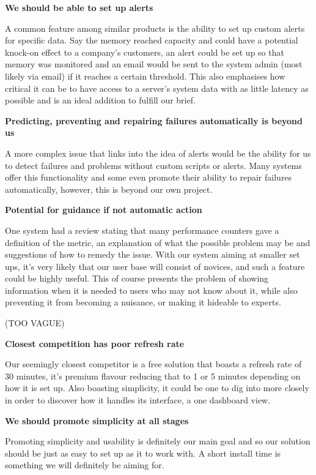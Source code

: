 \documentclass{l3proj}
\begin{document}
\textbf{We should be able to set up alerts}

A common feature among similar products is the ability to set up custom alerts for specific data. Say the memory reached capacity and could have a potential knock-on effect to a company’s customers, an alert could be set up so that memory was monitored and an email would be sent to the system admin (most likely via email) if it reaches a certain threshold. This also emphasises how critical it can be to have access to a server’s system data with as little latency as possible and is an ideal addition to fulfill our brief.

\textbf{Predicting, preventing and repairing failures automatically is beyond us}

A more complex issue that links into the idea of alerts would be the ability for us to detect failures and problems without custom scripts or alerts. Many systems offer this functionality and some even promote their ability to repair failures automatically, however, this is beyond our own project.

\textbf{Potential for guidance if not automatic action}

One system had a review stating that many performance counters gave a definition of the metric, an explanation of what the possible problem may be and suggestions of how to remedy the issue. With our system aiming at smaller set ups, it’s very likely that our user base will consist of novices, and such a feature could be highly useful. This of course presents the problem of showing information when it is needed to users who may not know about it, while also preventing it from becoming a nuisance, or making it hideable to experts.

(TOO VAGUE)

\textbf{Closest competition has poor refresh rate}

Our seemingly closest competitor is a free solution that boasts a refresh rate of 30 minutes, it’s premium flavour reducing that to 1 or 5 minutes depending on how it is set up. Also boasting simplicity, it could be one to dig into more closely in order to discover how it handles its interface, a one dashboard view.

\textbf{We should promote simplicity at all stages}

Promoting simplicity and usability is definitely our main goal and so our solution should be just as easy to set up as it to work with. A short install time is something we will definitely be aiming for.
\end{document}
